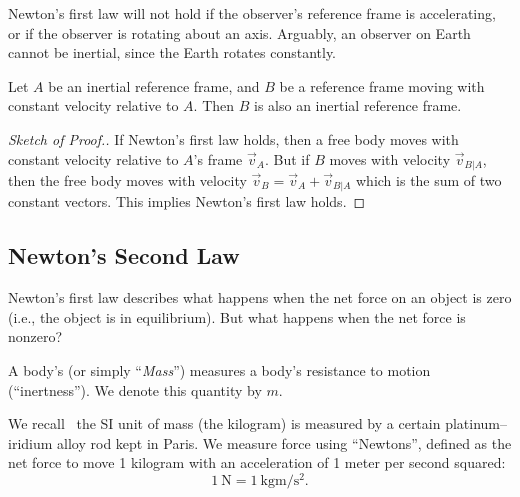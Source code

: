 \begin{remark}
Newton's first law will not hold if the observer's reference frame is
accelerating, or if the observer is rotating about an axis. Arguably, an
observer on Earth cannot be inertial, since the Earth rotates constantly.
\end{remark}

\begin{theorem}
Let $A$ be an inertial reference frame, and $B$ be a reference frame
moving with constant velocity relative to $A$. Then $B$ is also an
inertial reference frame.
\end{theorem}
\begin{proof}[Sketch of Proof.]
If Newton's first law holds, then a free body moves with constant velocity
relative to $A$'s frame $\vec{v}_{A}$. But if $B$ moves with velocity
$\vec{v}_{B|A}$, then the free body moves with velocity
$\vec{v}_{B}=\vec{v}_{A}+\vec{v}_{B|A}$ which is the sum of two constant
vectors. This implies Newton's first law  holds.
\end{proof}

\subsection{Newton's Second Law}

\M
Newton's first law  describes what happens when
the net force on an object is zero (i.e., the object is in
equilibrium). But what happens when the net force is nonzero?

\begin{definition}
A body's  (or simply ``\emph{Mass\/}'') measures a
body's resistance to motion (``inertness''). We denote this quantity by $m$.
\end{definition}

\begin{remark}
We recall~ the SI unit of mass (the
kilogram) is measured by a certain platinum--iridium alloy rod kept in
Paris. We measure force using ``Newtons'', defined as the net force to
move 1 kilogram with an acceleration of 1 meter per second squared:
\begin{equation}
\SI{1}{\newton}=\SI{1}{\kilo\gram\meter\per\second\squared}.
\end{equation}
\end{remark}

